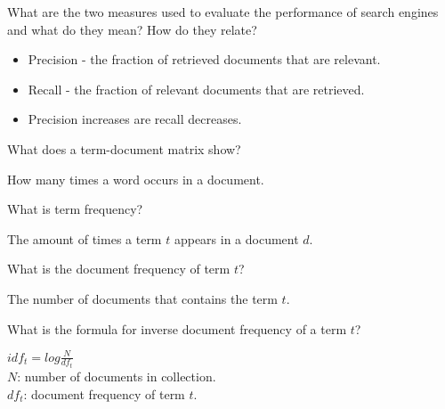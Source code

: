 \documentclass[2by4,grid]{flashcards}
\begin{document}
\begin{flashcard}{What are the two measures used to evaluate the performance of search engines and what do they mean? How do they relate?}
	\begin{center}
        \begin{itemize}
            \item Precision - the fraction of retrieved documents that are relevant.
            \item Recall - the fraction of relevant documents that are retrieved.
            \item Precision increases are recall decreases.
        \end{itemize}
	\end{center}
\end{flashcard}

\begin{flashcard}{What does a term-document matrix show?}
	\begin{center}
        How many times a word occurs in a document.
	\end{center}
\end{flashcard}

\begin{flashcard}{What is term frequency?}
	\begin{center}
        The amount of times a term $t$ appears in a document $d$.
	\end{center}
\end{flashcard}

\begin{flashcard}{What is the document frequency of term $t$?}
	\begin{center}
        The number of documents that contains the term $t$.
	\end{center}
\end{flashcard}

\begin{flashcard}{What is the formula for inverse document frequency of a term $t$?}
	\begin{center}
        $idf_t = log\frac{N}{df_t}$ \\ \vspace{.4cm}
        $N$: number of documents in collection. \\
        $df_t$: document frequency of term $t$.
	\end{center}
\end{flashcard}
\end{document}
